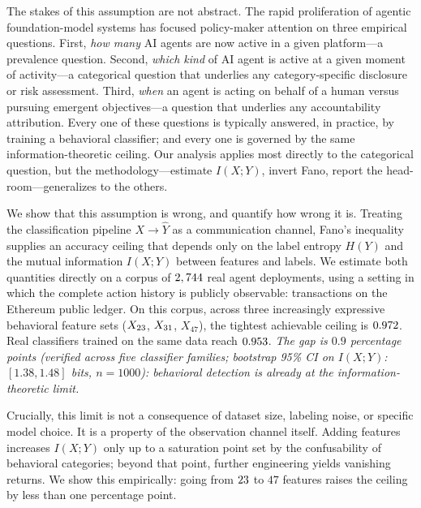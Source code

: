\documentclass[11pt,a4paper]{article}
\begin{document}
The stakes of this assumption are not abstract. The rapid proliferation of
agentic foundation-model systems\cite{wang2024survey,xi2023rise,park2023generative,chan2023harms}
has focused policy-maker attention on three empirical questions. First,
\emph{how many} AI agents are now active in a given platform---a prevalence
question. Second, \emph{which kind} of AI agent is active at a given moment
of activity---a categorical question that underlies any
category-specific disclosure or risk assessment. Third, \emph{when} an
agent is acting on behalf of a human versus pursuing emergent objectives---a
question that underlies any accountability attribution. Every one of these
questions is typically answered, in practice, by training a behavioral
classifier; and every one is governed by the same information-theoretic
ceiling. Our analysis applies most directly to the categorical question,
but the methodology---estimate $I(X;Y)$, invert Fano, report the
head-room---generalizes to the others.

We show that this assumption is wrong, and quantify how wrong it is. Treating
the classification pipeline $X \to \hat{Y}$ as a communication channel,
Fano's inequality\cite{cover2006} supplies an accuracy ceiling that depends
only on the label entropy $H(Y)$ and the mutual information $I(X;Y)$ between
features and labels. We estimate both quantities directly on a corpus of
$2,744$ real agent deployments, using a setting in which the complete
action history is publicly observable: transactions on the Ethereum public
ledger. On this corpus, across three increasingly expressive behavioral
feature sets ($X_{23}$, $X_{31}$, $X_{47}$), the tightest achievable ceiling
is $0.972$. Real classifiers trained on the same data reach
$0.953$. \emph{The gap is $0.9$ percentage points
(verified across five classifier families; bootstrap 95\% CI on $I(X;Y)$:
$[1.38, 1.48]$ bits, $n{=}1000$): behavioral detection is already at the
information-theoretic limit.}

Crucially, this limit is not a consequence of dataset size, labeling noise,
or specific model choice. It is a property of the observation channel itself.
Adding features increases $I(X;Y)$ only up to a saturation point set by the
confusability of behavioral categories; beyond that point, further
engineering yields vanishing returns. We show this empirically: going from
$23$ to $47$ features raises the ceiling by less than one percentage point.
\end{document}
